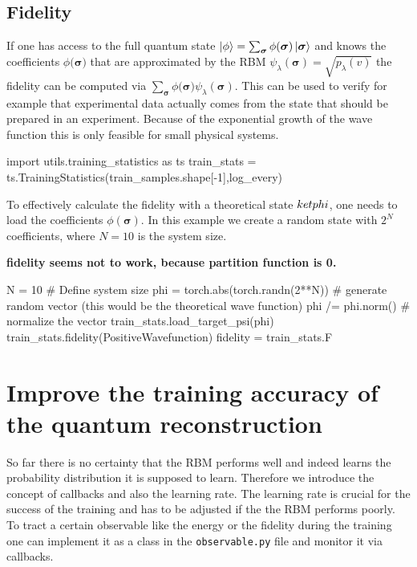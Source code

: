 \documentclass[submission, Phys]{SciPost}
\begin{document}
\subsection{Fidelity}

If one has access to the full quantum state $\ket{\phi} = \sum_{\bm{\sigma}} \phi(\bm{\sigma}) \ket{ \bm{\sigma}}$ and knows the coefficients $\phi(\bm{\sigma)}$ that are approximated by the RBM $\psi_{\lambda}(\bm{\sigma}) = \sqrt{p_{\lambda}(v)}$ the fidelity can be computed via $\sum_{\bm{\sigma}} \phi(\bm{\sigma)} \psi_{\lambda}(\bm{\sigma})$. This can be used to verify for example that experimental data actually comes from the state that should be prepared in an experiment. Because of the exponential growth of the wave function this is only feasible for small physical systems.

\begin{python}
import utils.training_statistics as ts
train_stats = ts.TrainingStatistics(train_samples.shape[-1],log_every)
\end{python}

To effectively calculate the fidelity with a theoretical state $\\ket{phi}$, one needs to load the coefficients $\phi(\bm{\sigma})$. In this example we create a random state with $2^N$ coefficients, where $N=10$ is the system size.

\textbf{fidelity seems not to work, because partition function is 0.}

\begin{python}
N = 10 # Define system size
phi =  torch.abs(torch.randn(2**N)) # generate random vector (this would be the theoretical wave function)
phi /= phi.norm() # normalize the vector
train_stats.load_target_psi(phi)
train_stats.fidelity(PositiveWavefunction)
fidelity = train_stats.F
\end{python}

\section{Improve the training accuracy of the quantum reconstruction}

So far there is no certainty that the RBM performs well and indeed learns the probability distribution it is supposed to learn. Therefore we introduce the concept of callbacks and also the learning rate. The learning rate is crucial for the success of the training and has to be adjusted if the the RBM performs poorly.
To tract a certain observable like the energy or the fidelity during the training one can implement it as a class in the \verb|observable.py| file and monitor it via callbacks.
\end{document}
